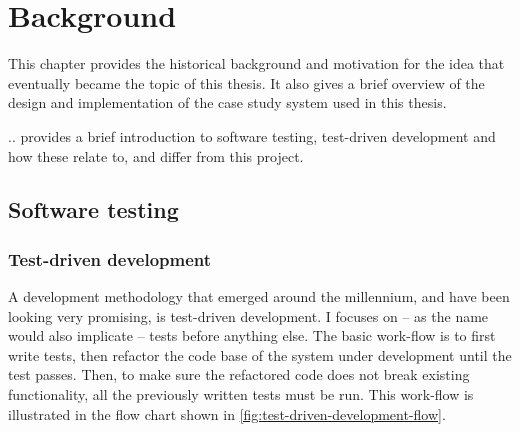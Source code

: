 

\chapter{Background}
This chapter provides the historical background and motivation for the idea that eventually became the topic of this thesis. It also gives a brief overview of the design and implementation of the case study system used in this thesis.

.. provides a brief introduction to software testing, test-driven development and how these relate to, and differ from this project.

\section{Software testing}

\subsection{Test-driven development}
A development methodology that emerged around the millennium, and have been looking very promising, is test-driven development. I focuses on -- as the name would also implicate -- tests before anything else. The basic work-flow is to first write tests, then refactor the code base of the system under development until the test passes. Then, to make sure the refactored code does not break existing functionality, all the previously written tests must be run. This work-flow is illustrated in the flow chart shown in \ref{fig:test-driven-development-flow}.

